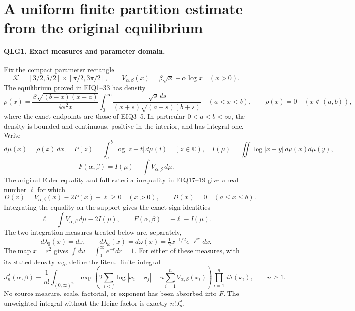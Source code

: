 \section{A uniform finite partition estimate from the original equilibrium}
\label{sec:QLG}

\paragraph{QLG1. Exact measures and parameter domain.}
Fix the compact parameter rectangle
\[
 \mathcal K=[3/2,5/2]\times[\pi/2,3\pi/2],\qquad
 V_{\alpha,\beta}(x)=\beta\sqrt{x}-\alpha\log x\quad(x>0).
 \tag{QLG1}
\]
The equilibrium proved in EIQ1--33 has density
\[
 \rho(x)=\frac{\beta\sqrt{(b-x)(x-a)}}{4\pi^2x}
       \int_0^\infty
       \frac{\sqrt{s}\,ds}{(x+s)\sqrt{(a+s)(b+s)}}\quad(a<x<b),
 \qquad \rho(x)=0\quad(x\notin(a,b)),
 \tag{QLG2}
\]
where the exact endpoints are those of EIQ3--5. In particular
\(0<a<b<\infty\), the density is bounded and continuous, positive
in the interior, and has integral one. Write
\[
 d\mu(x)=\rho(x)\,dx,\quad
 P(z)=\int_a^b\log|z-t|\,d\mu(t)\quad(z\in\mathbb C),\quad
 I(\mu)=\iint\log|x-y|\,d\mu(x)d\mu(y),
\]
\[
 F(\alpha,\beta)=I(\mu)-\int V_{\alpha,\beta}\,d\mu.
 \tag{QLG3}
\]
The original Euler equality and full exterior inequality in EIQ17--19
give a real number \(\ell\) for which
\[
 D(x)=V_{\alpha,\beta}(x)-2P(x)-\ell\geq0\quad(x>0),
 \qquad D(x)=0\quad(a\leq x\leq b).
 \tag{QLG4}
\]
Integrating the equality on the support gives the exact sign identities
\[
 \ell=\int V_{\alpha,\beta}\,d\mu-2I(\mu),\qquad
 F(\alpha,\beta)=-\ell-I(\mu).
 \tag{QLG5}
\]
The two integration measures treated below are, separately,
\[
 d\lambda_0(x)=dx,\qquad
 d\lambda_\omega(x)=d\omega(x)=\tfrac12 x^{-1/2}e^{-\sqrt{x}}\,dx.
 \tag{QLG6}
\]
The map \(x=r^2\) gives \(\int d\omega=\int_0^\infty e^{-r}dr=1\).
For either of these measures, with its stated density \(w_\lambda\),
define the literal finite integral
\[
 J_n^\lambda(\alpha,\beta)=\frac1{n!}
 \int_{(0,\infty)^n}
 \exp\!\left(2\sum_{i<j}\log|x_i-x_j|
                 -n\sum_{i=1}^n V_{\alpha,\beta}(x_i)\right)
       \prod_{i=1}^n d\lambda(x_i),\qquad n\geq1.
 \tag{QLG7}
\]
No source measure, scale, factorial, or exponent has been absorbed into
\(F\). The unweighted integral without the Heine factor is exactly
\(n!J_n^\lambda\).

